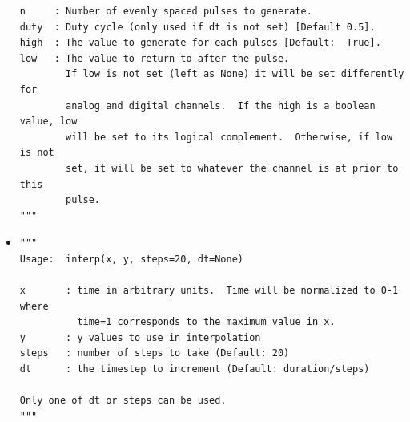 \begin{itemize}
\begin{lstlisting}
n     : Number of evenly spaced pulses to generate.
duty  : Duty cycle (only used if dt is not set) [Default 0.5].
high  : The value to generate for each pulses [Default:  True].
low   : The value to return to after the pulse.
        If low is not set (left as None) it will be set differently for
        analog and digital channels.  If the high is a boolean value, low
        will be set to its logical complement.  Otherwise, if low is not
        set, it will be set to whatever the channel is at prior to this
        pulse.
"""
\end{lstlisting}

\item {}
\begin{lstlisting}
"""
Usage:  interp(x, y, steps=20, dt=None)

x       : time in arbitrary units.  Time will be normalized to 0-1 where
          time=1 corresponds to the maximum value in x.
y       : y values to use in interpolation
steps   : number of steps to take (Default: 20)
dt      : the timestep to increment (Default: duration/steps)

Only one of dt or steps can be used.
"""
\end{lstlisting}

\end{itemize}
